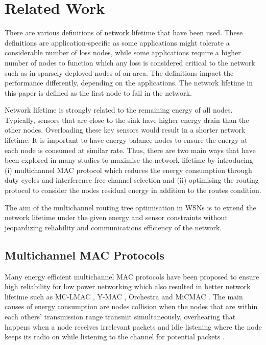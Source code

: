 \section{Related Work}
\label{RelatedWork}

There are various definitions of network lifetime that have been used. These definitions are application-specific as some applications might tolerate a considerable number of loss nodes, while some applications require a higher number of nodes to function which any loss is considered critical to the network such as in sparsely deployed nodes of an area. The definitions impact the performance differently, depending on the applications. The network lifetime in this paper is defined as the first node to fail in the network.

Network lifetime is strongly related to the remaining energy of all nodes. Typically, sensors that are close to the sink have higher energy drain than the other nodes. Overloading these key sensors would result in a shorter network lifetime.
It is important to have energy balance nodes to ensure the energy at each node is consumed at similar rate.
Thus, there are two main ways that have been explored in many studies to maximise the network lifetime by introducing (i) multichannel MAC protocol which reduces the energy consumption through duty cycles and interference free channel selection and (ii) optimising the routing protocol to consider the nodes residual energy in addition to the routes condition.

The aim of the multichannel routing tree optimisation in WSNs is to extend the network lifetime under the given energy and sensor constraints without jeopardizing reliability and communications efficiency of the network.

\subsection{Multichannel MAC Protocols}
Many energy efficient multichannel MAC protocols have been proposed to ensure high reliability for low power networking which also resulted in better network lifetime such as MC-LMAC \cite{mc-lmac}, Y-MAC \cite{y-mac}, Orchestra \cite{orchestra} and MiCMAC \cite{micmac}.  
The main causes of energy consumption are nodes collision when the nodes that are within each others' transmission range transmit simultaneously, overhearing that happens when a node receives irrelevant packets and idle listening where the node keeps its radio on while listening to the channel for potential packets \cite{macsurvey}.

